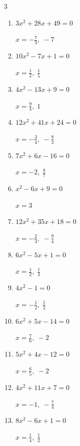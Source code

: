\begin{multicols}{3}
\begin{enumerate}
  \item $3x^{2}+28x+49=0$

        $\displaystyle x=-\frac{7}{3},\; -7$

\columnbreak %

  \item $10x^{2}-7x+1=0$

        $\displaystyle x=\frac{1}{2},\; \frac{1}{5}$

  \item $4x^{2}-13x+9=0$

        $\displaystyle x=\frac{9}{4},\; 1$

  \item $12x^{2}+41x+24=0$

        $\displaystyle x=-\frac{3}{4},\; -\frac{8}{3}$

  \item $7x^{2}+6x-16=0$

        $\displaystyle x=-2,\; \frac{8}{7}$

  \item $x^{2}-6x+9=0$

        $\displaystyle x=3$

  \item $12x^{2}+35x+18=0$

        $\displaystyle x=-\frac{2}{3},\; -\frac{9}{4}$

  \item $6x^{2}-5x+1=0$

        $\displaystyle x=\frac{1}{2},\; \frac{1}{3}$

  \item $4x^{2}-1=0$

        $\displaystyle x=-\frac{1}{2},\; \frac{1}{2}$

  \item $6x^{2}+5x-14=0$

        $\displaystyle x=\frac{7}{6},\; -2$

  \item $5x^{2}+4x-12=0$

        $\displaystyle x=\frac{6}{5},\; -2$

\columnbreak %

  \item $4x^{2}+11x+7=0$

        $\displaystyle x=-1,\; -\frac{7}{4}$

  \item $8x^{2}-6x+1=0$

        $\displaystyle x=\frac{1}{4},\; \frac{1}{2}$


\end{enumerate}
\end{multicols}
